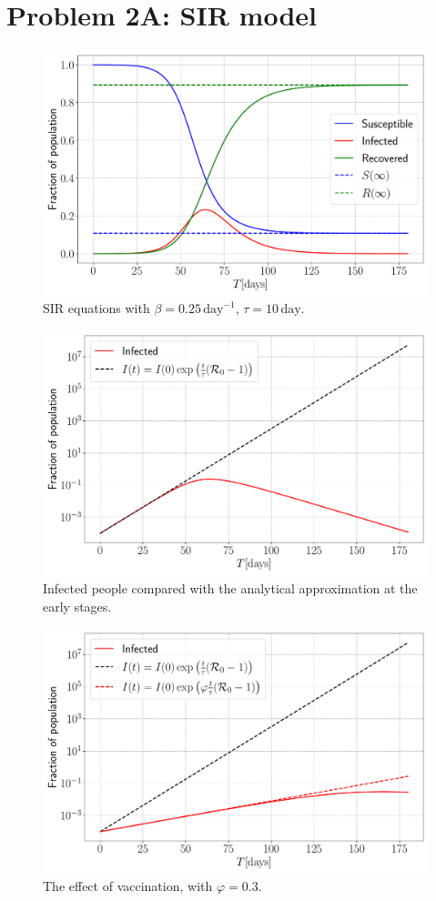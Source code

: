 \section{Problem 2A: SIR model}

\begin{figure}[htb]
	\centering
	\includegraphics[width=0.8\columnwidth]{../fig/2Aa_SIR.pdf}
	\caption{SIR equations with $\beta = 0.25 \, \mathrm{day}^{-1}$, $\tau = 10 \, \mathrm{day}$.}
	\label{fig:SIR}
\end{figure}

\begin{figure}[htb]
	\centering
	\includegraphics[width=0.8\columnwidth]{../fig/2Ab_I.pdf}
	\caption{Infected people compared with the analytical approximation at the early stages.}
	\label{fig:Infected}
\end{figure}

\begin{figure}[htb]
	\centering
	\includegraphics[width=0.8\columnwidth]{../fig/vac.pdf}
	\caption{The effect of vaccination, with $\varphi = 0.3$.}
	\label{fig:vaccination}
\end{figure}


